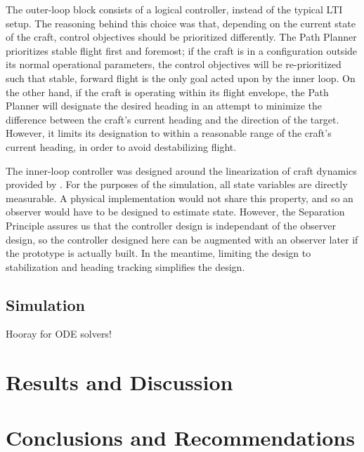 \documentclass{sydeStyle}
\begin{document}

The outer-loop block consists of a logical controller, instead of the typical
LTI setup.  The reasoning behind this choice was that, depending on the current
state of the craft, control objectives should be prioritized differently.  The
Path Planner prioritizes stable flight first and foremost; if the craft is in a
configuration outside its normal operational parameters, the control objectives
will be re-prioritized such that stable, forward flight is the only goal acted
upon by the inner loop.  On the other hand, if the craft is operating within its
flight envelope, the Path Planner will designate the desired heading in an
attempt to minimize the difference between the craft's current heading and the
direction of the target.  However, it limits its designation to within a
reasonable range of the craft's current heading, in order to avoid destabilizing
flight.


The inner-loop controller was designed around the linearization of craft
dynamics provided by \cite{spottiswoode}.  For the purposes of the simulation,
all state variables are directly measurable.  A physical implementation would
not share this property, and so an observer would have to be designed to
estimate state.  However, the Separation Principle assures us that the
controller design is independant of the observer design, so the controller
designed here can be augmented with an observer later if the prototype is
actually built.  In the meantime, limiting the design to stabilization and
heading tracking simplifies the design.

\section{Simulation}
Hooray for ODE solvers!

\chapter{Results and Discussion}

\chapter{Conclusions and Recommendations}
\end{document}
